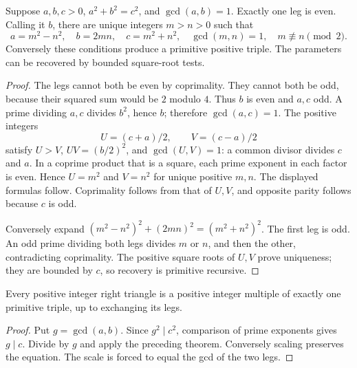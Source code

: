 \begin{theorem}\label{dio:pythagoras}
Suppose $a,b,c>0$, $a^2+b^2=c^2$, and $\gcd(a,b)=1$.
Exactly one leg is even. Calling it $b$, there are unique integers
$m>n>0$ such that
\[
 a=m^2-n^2,\quad b=2mn,\quad c=m^2+n^2,\quad
 \gcd(m,n)=1,\quad m\not\equiv n\pmod2.
\]
Conversely these conditions produce a primitive positive triple.
The parameters can be recovered by bounded square-root tests.
\end{theorem}
\begin{proof}
The legs cannot both be even by coprimality. They cannot both be odd,
because their squared sum would be $2$ modulo $4$. Thus $b$ is even
and $a,c$ odd. A prime dividing $a,c$ divides $b^2$, hence $b$;
therefore $\gcd(a,c)=1$. The positive integers
\[
 U=(c+a)/2,\qquad V=(c-a)/2
\]
satisfy $U>V$, $UV=(b/2)^2$, and $\gcd(U,V)=1$: a common divisor
divides $c$ and $a$. In a coprime product that is a square, each prime
exponent in each factor is even. Hence $U=m^2$ and $V=n^2$ for unique
positive $m,n$. The displayed formulas follow. Coprimality follows
from that of $U,V$, and opposite parity follows because $c$ is odd.

Conversely expand
$(m^2-n^2)^2+(2mn)^2=(m^2+n^2)^2$.
The first leg is odd. An odd prime dividing both legs divides $m$ or
$n$, and then the other, contradicting coprimality.
The positive square roots of $U,V$ prove uniqueness; they are bounded
by $c$, so recovery is primitive recursive.
\end{proof}

\begin{corollary}\label{dio:all-triples}
Every positive integer right triangle is a positive integer multiple of
exactly one primitive triple, up to exchanging its legs.
\end{corollary}
\begin{proof}
Put $g=\gcd(a,b)$. Since $g^2\mid c^2$, comparison of prime
exponents gives $g\mid c$. Divide by $g$ and apply the preceding
theorem. Conversely scaling preserves the equation.
The scale is forced to equal the gcd of the two legs.
\end{proof}

